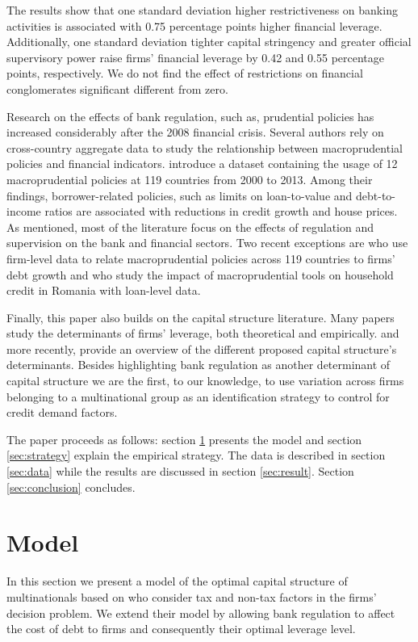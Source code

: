 \documentclass[12pt]{article}
\begin{document}
	The results show that one standard deviation higher restrictiveness on banking activities is associated with 0.75 percentage points higher financial leverage. Additionally, one standard deviation tighter capital stringency and greater official supervisory power raise firms' financial leverage by 0.42 and 0.55 percentage points, respectively. We do not find the effect of restrictions on financial conglomerates significant different from zero. 
	
	Research on the effects of bank regulation, such as, prudential policies has increased considerably after the 2008 financial crisis. Several authors rely on cross-country aggregate data to study the relationship between macroprudential policies and financial indicators. \cite*{cerutti2017use} introduce a dataset containing the usage of 12 macroprudential policies at 119 countries from 2000 to 2013. Among their findings, borrower-related policies, such as limits on loan-to-value and debt-to-income ratios are associated with reductions in credit growth and house prices. As mentioned, most of the literature focus on the effects of regulation and supervision on the bank and financial sectors. Two recent exceptions are \cite*{ayyagari2017credit} who use firm-level data to relate macroprudential policies across 119 countries to firms' debt growth and \cite*{epure2017household} who study the impact of macroprudential tools on household credit in Romania with loan-level data.    
	
	Finally, this paper also builds on the capital structure literature. Many papers study the determinants of firms' leverage, both theoretical and empirically. \cite*{titman1988determinants} and more recently, \cite*{oztekin2015capital} provide an overview of the different proposed capital structure's determinants. Besides highlighting bank regulation as another determinant of capital structure we are the first, to our knowledge, to use variation across firms belonging to a multinational group as an identification strategy to control for credit demand factors.          
	
	The paper proceeds as follows: section \ref{sec:model} presents the model and section \ref{sec:strategy} explain the empirical strategy. The data is described in section \ref{sec:data} while the results are discussed in section \ref{sec:result}. Section \ref{sec:conclusion} concludes. 
	
		\section{Model} \label{sec:model}
	In this section we present a model of the optimal capital structure of multinationals based on \cite{huizinga2008capital} who consider tax and non-tax factors in the firms' decision problem. We extend their model by allowing bank regulation to affect the cost of debt to firms and consequently their optimal leverage level.  
	
\end{document}
